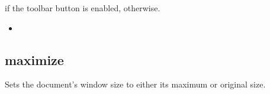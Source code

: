 \documentclass[letterpaper,12pt,english,openany,oneside]{sphinxmanual}
\begin{document}

 if the toolbar button is enabled,  otherwise.

\label{\detokenize{IAC_API_AppleEvtObjects:related-events-19}}
\begin{itemize}
\item {} 

\end{itemize}
\label{\detokenize{IAC_API_AppleEvtObjects:applescript-example-25}}

\begin{sphinxVerbatim}[commandchars=\\\{\}]
    
\end{sphinxVerbatim}
\label{\detokenize{IAC_API_AppleEvtObjects:apple-event-id-16}}

\begin{sphinxVerbatim}[commandchars=\\\{\}]
 
\end{sphinxVerbatim}
\label{\detokenize{IAC_API_AppleEvtObjects:apple-event-parameters-6}}

\begin{sphinxVerbatim}[commandchars=\\\{\}]
 
\end{sphinxVerbatim}




\subsection{maximize}
\label{\detokenize{IAC_API_AppleEvtObjects:maximize}}
Sets the document’s window size to either its maximum or original size.

\label{\detokenize{IAC_API_AppleEvtObjects:syntax-29}}
\end{document}
